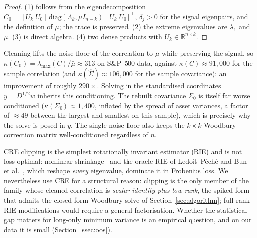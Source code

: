 \begin{proof}
(1) follows from the eigendecomposition
$C_0 = [U_k\;U_0]\,\mathrm{diag}(\Lambda_k, \bar\mu I_{n-k})\,[U_k\;U_0]^\top$,
$\delta_j > 0$ for the signal eigenpairs, and the definition of $\bar\mu$; the
trace is preserved.
(2) the extreme eigenvalues are $\lambda_1$ and $\bar\mu$.
(3) is direct algebra.
(4) two dense products with $U_k \in \mathbb{R}^{n \times k}$.
\end{proof}

\begin{remark}\label{rem:kappa}
Cleaning lifts the noise floor of the correlation to $\bar\mu$ while preserving the
signal, so $\kappa(C_0) = \lambda_{\max}(C)/\bar\mu \approx 313$ on S\&P~500 data,
against $\kappa(C) \approx 91{,}000$ for the sample correlation (and
$\kappa(\hat\Sigma) \approx 106{,}000$ for the sample covariance): an improvement
of roughly $290\times$. Solving in the standardised coordinates $y = D^{1/2}w$
inherits this conditioning. The rebuilt covariance $\Sigma_0$ is itself far worse
conditioned ($\kappa(\Sigma_0) \approx 1{,}400$, inflated by the spread of asset
variances, a factor of $\approx 49$ between the largest and smallest on this
sample), which is precisely why the solve is posed in $y$. The single noise floor
also keeps the $k \times k$ Woodbury correction matrix well-conditioned regardless
of $n$.
\end{remark}

\begin{remark}\label{rem:rie}
CRE clipping is the simplest rotationally invariant estimator (RIE) and is not
loss-optimal: nonlinear shrinkage~\cite{ledoit2012,ledoit2020} and the oracle RIE
of Ledoit--P\'ech\'e and Bun et al.~\cite{ledoitpeche2011,bun2017}, which reshape
\emph{every} eigenvalue, dominate it in Frobenius loss. We nevertheless use CRE
for a structural reason: clipping is the only member of the family whose cleaned
correlation is \emph{scalar-identity-plus-low-rank}, the spiked
form~\cite{johnstone2001} that admits the closed-form Woodbury solve of
Section~\ref{sec:algorithm}; full-rank RIE modifications would require a general
factorisation. Whether the statistical gap matters for long-only minimum variance
is an empirical question, and on our data it is small (Section~\ref{ssec:oos}).
\end{remark}

